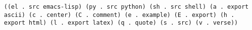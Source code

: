 \documentclass[11pt]{article}
\begin{document}
\begin{verbatim}
((el . src emacs-lisp) (py . src python) (sh . src shell) (a . export ascii) (c . center) (C . comment) (e . example) (E . export) (h . export html) (l . export latex) (q . quote) (s . src) (v . verse))
\end{verbatim}





\end{document}
